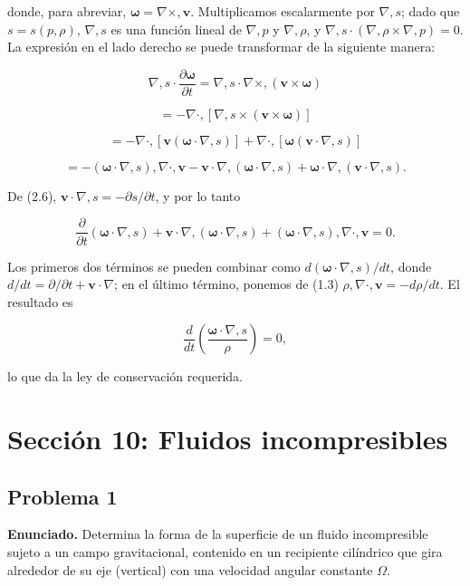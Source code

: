 \documentclass{article}
\begin{document}
donde, para abreviar, $\boldsymbol{\omega} = \nabla \times , \mathbf{v}$. Multiplicamos escalarmente por $\nabla , s$; dado que $s = s(p, \rho)$, $\nabla , s$ es una función lineal de $\nabla , p$ y $\nabla , \rho$, y $\nabla , s \cdot (\nabla , \rho \times \nabla , p) = 0$. La expresión en el lado derecho se puede transformar de la siguiente manera:

$$
\nabla , s \cdot \frac{\partial \boldsymbol{\omega}}{\partial t} = \nabla , s \cdot \nabla \times , (\mathbf{v} \times \boldsymbol{\omega})
$$

$$
= -\nabla \cdot , [\nabla , s \times (\mathbf{v} \times \boldsymbol{\omega})]
$$

$$
= -\nabla \cdot , [\mathbf{v} (\boldsymbol{\omega} \cdot \nabla , s)] + \nabla \cdot , [\boldsymbol{\omega} (\mathbf{v} \cdot \nabla , s)]
$$

$$
= -(\boldsymbol{\omega} \cdot \nabla , s) , \nabla \cdot , \mathbf{v} - \mathbf{v} \cdot \nabla , (\boldsymbol{\omega} \cdot \nabla , s) + \boldsymbol{\omega} \cdot \nabla , (\mathbf{v} \cdot \nabla , s).
$$

De (2.6), $\mathbf{v} \cdot \nabla , s = -\partial s/\partial t$, y por lo tanto

$$
\frac{\partial}{\partial t} (\boldsymbol{\omega} \cdot \nabla , s) + \mathbf{v} \cdot \nabla , (\boldsymbol{\omega} \cdot \nabla , s) + (\boldsymbol{\omega} \cdot \nabla , s) , \nabla \cdot , \mathbf{v} = 0.
$$

Los primeros dos términos se pueden combinar como $d(\boldsymbol{\omega} \cdot \nabla , s)/dt$, donde $d/dt = \partial/\partial t + \mathbf{v} \cdot \nabla$; en el último término, ponemos de (1.3) $\rho , \nabla \cdot , \mathbf{v} = -d\rho/dt$. El resultado es

$$
\frac{d}{dt} \left( \frac{\boldsymbol{\omega} \cdot \nabla , s}{\rho} \right) = 0,
$$

lo que da la ley de conservación requerida.

\section*{Sección 10: Fluidos incompresibles}
\subsection*{Problema 1}

\textbf{Enunciado.} Determina la forma de la superficie de un fluido incompresible sujeto a un campo gravitacional, contenido en un recipiente cilíndrico que gira alrededor de su eje (vertical) con una velocidad angular constante $\Omega$.
\end{document}
